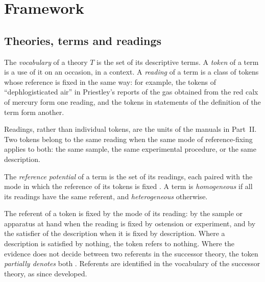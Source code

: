 \documentclass{situationist-preprint}
\begin{document}
\section{Framework}\label{s:framework}

\subsection{Theories, terms and readings}

\begin{definition}\label{d:reading}
The \emph{vocabulary} of a theory $T$ is the set of its descriptive terms. A \emph{token} of a term is a use of it on an occasion, in a context. A \emph{reading} of a term is a class of tokens whose reference is fixed in the same way: for example, the tokens of \enquote{dephlogisticated air} in Priestley's reports of the gas obtained from the red calx of mercury form one reading, and the tokens in statements of the definition of the term form another.
\end{definition}

Readings, rather than individual tokens, are the units of the manuals in Part~II. Two tokens belong to the same reading when the same mode of reference-fixing applies to both: the same sample, the same experimental procedure, or the same description.

\begin{definition}\label{d:refpot}
The \emph{reference potential} of a term is the set of its readings, each paired with the mode in which the reference of its tokens is fixed \citep{Kitcher1978}. A term is \emph{homogeneous} if all its readings have the same referent, and \emph{heterogeneous} otherwise.
\end{definition}

\begin{assumption}\label{a:token}
The referent of a token is fixed by the mode of its reading: by the sample or apparatus at hand when the reading is fixed by ostension or experiment, and by the satisfier of the description when it is fixed by description. Where a description is satisfied by nothing, the token refers to nothing. Where the evidence does not decide between two referents in the successor theory, the token \emph{partially denotes} both \citep{Field1973}. Referents are identified in the vocabulary of the successor theory, as since developed.
\end{assumption}
\end{document}
